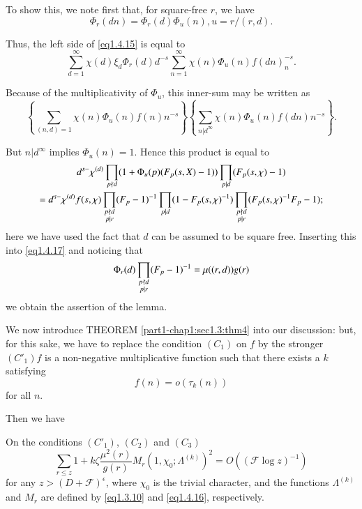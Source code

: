 To show this, we note first that, for square-free $r$, we have 
$$
\Phi_r (dn) = \Phi_r (d) \Phi_u (n), u = r/(r,d).
$$

Thus, the left side of \eqref{eq1.4.15} is equal to 
\begin{equation*}
  \sum_{d=1}^\infty \chi(d) \xi_d \Phi_r (d)d^{-s}
  \sum_{n=1}^\infty \chi(n) \Phi_u (n) f (dn)_n^{-s}. \tag
      {1.4.17} \label{eq1.4.17} 
\end{equation*}

Because of the multiplicativity of $\Phi_u$, this inner-sum may be written as 
$$
\left\{\sum _{(n,d) = 1} \chi(n) \Phi_u (n) f(n)n^{-s}\right\} \left\{
\sum_{{n|d}^\infty} \chi (n) \Phi_u (n)f(dn)n^{-s}\right\}. 
$$

But $n|d^\infty$ implies $\Phi_u (n) = 1$. Hence this product is equal to 
{\fontsize{10pt}{12pt}\selectfont
\begin{gather*}
  d^{s-} \chi^{(d)} \prod_{p \not\mid d} (1+\Phi_u (p) (F_p (s,X)-1))
  \prod_{p|d} (F_p (s,\chi) -1) \\
  = d^{s-} \chi^{(d)} f (s,\chi) \prod_{\substack{p \not\mid d \\p|r}}
  (F_p -1)^{-1} \prod_{p|d} (1-F_p (s, \chi)^{-1}) \prod_{\substack{p
    \not\mid d \\p|r}} (F_p (s, \chi)^{-1} F_p -1);  
\end{gather*}}\relax
here we have used the fact that $d$ can be assumed to be square
free. Inserting this into \eqref{eq1.4.17} and noticing that 
$$
\Phi_r(d) \prod_{\substack{p \not\mid d \\ p|r}} (F_p
-1)^{-1} = \mu ((r,d))g(r) 
$$\pageoriginale
we obtain the assertion of the lemma.

We now introduce THEOREM \ref{part1-chap1:sec1.3:thm4} into our
discussion: but, for this sake, 
we have to replace the condition $(C_1)$ on $f$ by the stronger $(C'_1)
f$ is a non-negative multiplicative function such that there exists a
$k$ satisfying  
$$
f(n) = o(\tau_k(n)) 
$$
for all $n$.

Then we have
\begin{Lemma}\label{part1-chap1:sec1.4:lem6}%
On the conditions $(C'_1)$, $(C_2)$ and $(C_3)$
  $$
    \sum_{r \le z} 1+k\zeta \frac{\mu^2 (r)} {g(r)}
    M_r \left(1, \chi_0 ; \Lambda^{(k)}\right)^2 = O((\mathscr{F} \log
    z)^{-1}) 
  $$
for any  $z > (D + \mathscr{F})^\epsilon $, where $\chi_0$ is the
trivial character, and the functions $\Lambda^{(k)}$ and $M_r$
are defined by \eqref{eq1.3.10} and \eqref{eq1.4.16},
respectively.  
\end{Lemma}

